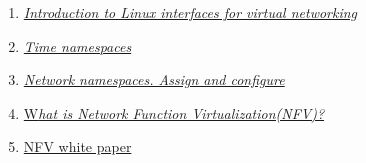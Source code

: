 \documentclass[a4paper, oneside, 12pt]{book}
\begin{document}
\begin{enumerate}
		\item
		\label{bib:virtual interface list}
		\href{https://developers.redhat.com/blog/2018/10/22/introduction-to-linux-interfaces-for-virtual-networking#veth}{\textit{Introduction to Linux interfaces for virtual networking}}
		
		
		
		\item
		\label{bib:time ns kernel}
		\href{https://git.kernel.org/pub/scm/linux/kernel/git/tip/tip.git/commit/?h=timers/core&id=769071ac9f20b6a447410c7eaa55d1a5233ef40c}{\textit{Time namespaces}}
		
		\item
		\label{bib:example netns veth}
		\href{https://blog.scottlowe.org/2013/09/04/introducing-linux-network-namespaces/}{\textit{Network namespaces. Assign and configure}}
		
		
		
		
		
		
		\item
		\label{bib: what is nfv}
		\href{https://www.ciena.com/insights/articles/What-is-NFV-prx.html}{W\textit{hat is Network Function Virtualization(NFV)?}}
		
		\item
		\label{paper nfv 2012}
		\href{https://portal.etsi.org/nfv/nfv_white_paper.pdf}{NFV white paper}
		
		

\end{enumerate}
\end{document}
